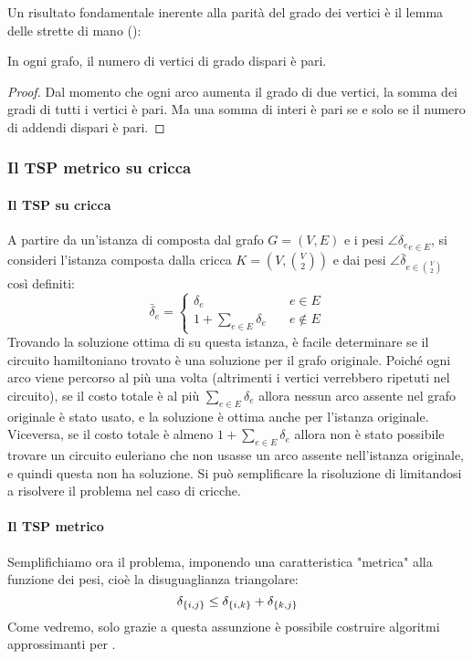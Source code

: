Un risultato fondamentale inerente alla parità del grado dei vertici è il lemma delle strette di mano ():
\begin{lemma}\label{lem:handshaking}
	In ogni grafo, il numero di vertici di grado dispari è pari.
\end{lemma}
\begin{proof}
	Dal momento che ogni arco aumenta il grado di due vertici, la somma dei gradi di tutti i vertici è pari. Ma una somma di interi è pari se e solo se il numero di addendi dispari è pari.
\end{proof}

\subsubsection{Il TSP metrico su cricca}\label{subsub:tsp:criccametrica}

\paragraph{Il TSP su cricca} A partire da un'istanza di \TravelingSalesman composta dal grafo $G=(V,E)$ e i pesi $\angle{\delta_e}_{e\in E}$, si consideri l'istanza composta dalla cricca $K=\left(V,\binom V 2\right)$ e dai pesi $\angle{\bar\delta}_{e\in\binom V 2}$ così definiti:
\begin{equation*}
	\bar\delta_e = \begin{cases}
		\delta_e                 & \quad e \in E    \\
		1+\sum_{e\in E} \delta_e & \quad e \notin E
	\end{cases}
\end{equation*}
Trovando la soluzione ottima di \TravelingSalesman su questa istanza, è facile determinare se il circuito hamiltoniano trovato è una soluzione per il grafo originale.
Poiché ogni arco viene percorso al più una volta (altrimenti i vertici verrebbero ripetuti nel circuito), se il costo totale è al più $\sum_{e\in E} \delta_e$ allora nessun arco assente nel grafo originale è stato usato, e la soluzione è ottima anche per l'istanza originale.
Viceversa, se il costo totale è almeno $1+\sum_{e\in E} \delta_e$ allora non è stato possibile trovare un circuito euleriano che non usasse un arco assente nell'istanza originale, e quindi questa non ha soluzione.
Si può semplificare la risoluzione di \TravelingSalesman limitandosi a risolvere il problema nel caso di cricche.

\paragraph{Il TSP metrico} Semplifichiamo ora il problema, imponendo una caratteristica "metrica" alla funzione dei pesi, cioè la disuguaglianza triangolare:
\begin{equation*}
	\delta_{\left\{ i,j \right\}} \leq \delta_{\left\{ i,k \right\}} + \delta_{\left\{ k,j \right\}}
\end{equation*}
Come vedremo, solo grazie a questa assunzione è possibile costruire algoritmi approssimanti per \TravelingSalesman.

